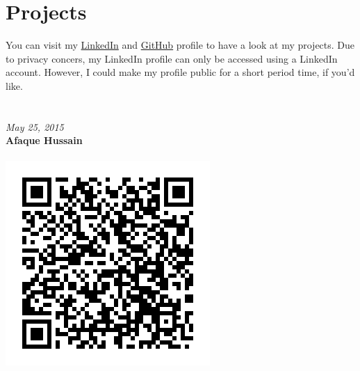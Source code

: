 \documentclass[]{friggeri-cv}
\begin{document}
\section{Projects}
You can visit my \href{http://www.linkedin.com/in/afaquejam}{LinkedIn} and \href{https://github.com/afaquejam}{GitHub} profile to have a look at my projects.
Due to privacy concers, my LinkedIn profile can only be accessed using a LinkedIn account. However, I could make my profile public for a short period time, if you'd like.
\\
\\
\\
\emph{May 25, 2015} \\
\textbf{Afaque Hussain} \\
\\
\includegraphics[scale=0.40]{img/qrcode.png}
\end{document}
